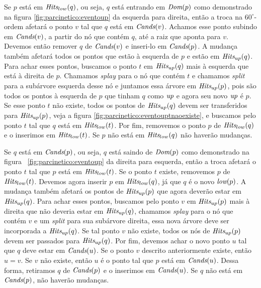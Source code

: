 Se $p$ está em $\textit{Hits}_{low}(q)$, ou seja, $q$ está entrando em
$\textit{Dom}(p)$ como demonstrado na figura \ref{fig:parcinetico:eventoup}
da esquerda para direita, então a troca na $60^\circ$-ordem afetará
o ponto $v$ tal que $q$ está em $\textit{Cands}(v)$. Achamos esse ponto
subindo em $\textit{Cands}(v)$, a partir do nó que contém $q$, até a raiz
que aponta para $v$. Devemos então remover $q$ de $\textit{Cands}(v)$ e
inseri-lo em $\textit{Cands}(p)$. A mudança também afetará todos os pontos
que estão à esquerda de $p$ e estão em $\textit{Hits}_{up}(q)$. Para achar
esses pontos, buscamos o ponto $t$ em $\textit{Hits}_{up}(q)$ mais à
esquerda que está à direita de $p$. Chamamos \textit{splay} para o
nó que contém $t$ e chamamos \textit{split} para a subárvore
esquerda desse nó e juntamos essa árvore em $\textit{Hits}_{up}(p)$, pois
são todos os pontos à esquerda de $p$ que tinham $q$ como $\textit{up}$ e
agora seu novo $\textit{up}$ é $p$. Se esse ponto $t$ não existe, todos os
pontos de $\textit{Hits}_{up}(q)$ devem ser transferidos para
$\textit{Hits}_{up}(p)$, veja a figura
\ref{fig:parcinetico:eventouptnaoexiste}, e buscamos pelo ponto $t$
tal que $q$ está em $\textit{Hits}_{low}(t)$. Por fim, removemos o ponto $p$
de $\textit{Hits}_{low}(q)$ e o inserimos em $\textit{Hits}_{low}(t)$. Se $p$ não
está em $\textit{Hits}_{low}(q)$ não haverão mudanças.

Se $q$ está em $\textit{Cands}(p)$, ou seja, $q$ está saindo de $\textit{Dom}(p)$
como demonstrado na figura~ \ref{fig:parcinetico:eventoup} da
direita para esquerda, então a troca afetará o ponto $t$ tal que $p$
está em $\textit{Hits}_{low}(t)$. Se o ponto $t$ existe, removemos $p$ de
$\textit{Hits}_{low}(t)$. Devemos agora inserir $p$ em $\textit{Hits}_{low}(q)$, já
que $q$ é o novo $\textit{low}(p)$. A mudança também afetará os pontos de
$\textit{Hits}_{up}(p)$ que agora deverão estar em $\textit{Hits}_{up}(q)$. Para
achar esses pontos, buscamos pelo ponto $v$ em $\textit{Hits}_{up}(p)$ mais
à direita que não deveria estar em $\textit{Hits}_{up}(q)$, chamamos
\textit{splay} para o nó que contém $v$ e um \textit{split} para sua
subárvore direita, essa nova árvore deve ser incorporada a
$\textit{Hits}_{up}(q)$. Se tal ponto $v$ não existe, todos os nós de
$\textit{Hits}_{up}(p)$ devem ser passados para $\textit{Hits}_{up}(q)$. Por fim,
devemos achar o novo ponto $u$ tal que $q$ deve estar em
$\textit{Cands}(u)$. Se o ponto $v$ descrito anteriormente existe, então $u
= v$. Se $v$ não existe, então $u$ é o ponto tal que $p$ está em
$\textit{Cands}(u)$. Dessa forma, retiramos $q$ de $\textit{Cands}(p)$ e o inserimos
em $\textit{Cands}(u)$. Se $q$ não está em $\textit{Cands}(p)$, não haverão
mudanças.



